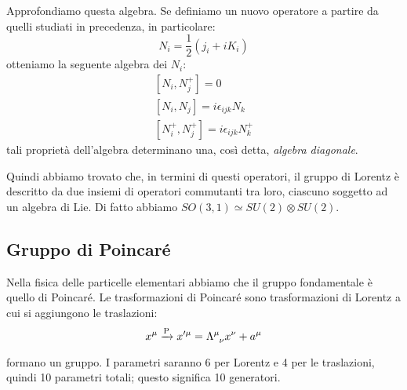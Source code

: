 Approfondiamo questa algebra. Se definiamo un nuovo operatore a partire da quelli studiati in precedenza, in particolare:
\begin{equation}
    N_i=\dfrac{1}{2}(j_i+iK_i)
\end{equation}
otteniamo la seguente algebra dei $N_i$:
\begin{equation}
    \begin{gathered}
        \left[N_i,N_j^+\right]=0\\
        \left[N_i,N_j\right]=i\epsilon_{ijk}N_k\\
         \left[N_i^+,N_j^+\right]=i\epsilon_{ijk}N_k^+
    \end{gathered}
\end{equation}
tali proprietà dell'algebra determinano una, così detta, \textit{algebra diagonale}.

Quindi abbiamo trovato che, in termini di questi operatori, il gruppo di Lorentz è descritto da due insiemi di operatori commutanti tra loro, ciascuno soggetto ad un algebra di Lie. Di fatto abbiamo $SO(3,1)\simeq SU(2)\otimes SU(2)$.


\subsection{Gruppo di Poincaré}
Nella fisica delle particelle elementari abbiamo che il gruppo fondamentale è quello di Poincaré. Le trasformazioni di Poincaré sono trasformazioni di Lorentz a cui si aggiungono le traslazioni:
\begin{equation}
  x^\mu\xrightarrow[\text{}]{\text{P}}x'^{\mu}=\Lambda\indices{^\mu_\nu} x^{\nu} +a^\mu
\end{equation}
formano un gruppo. I parametri saranno 6 per Lorentz e 4 per le traslazioni, quindi 10 parametri totali; questo significa 10 generatori.

